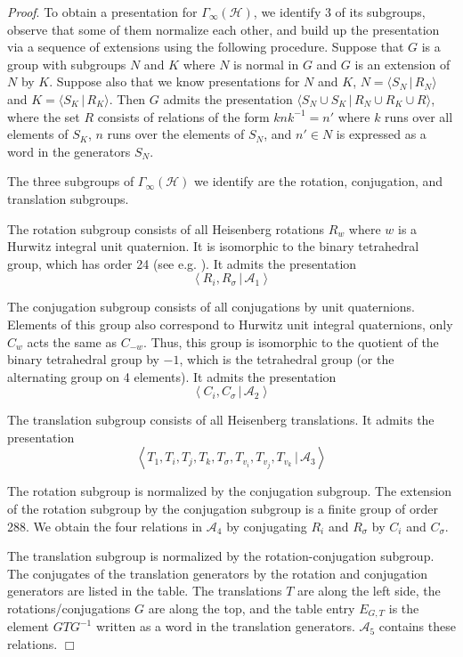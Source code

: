 \documentclass{article}[12pt]
\newcommand{\Pf}{{\em Proof}. }
\newcommand{\EPf}{\hfill$\Box$\vspace{.5cm}}
\begin{document}
\Pf To obtain a presentation for $\Gamma_{\infty}(\mathcal{H})$, we identify 3 of its subgroups, observe that some of them normalize each other, and build up the presentation via a sequence of extensions using the following procedure.  Suppose that $G$ is a group with subgroups $N$ and $K$ where $N$ is normal in $G$ and $G$ is an extension of $N$ by $K$.  Suppose also that we know presentations for $N$ and $K$, $N = \langle S_N\, | \, R_N\rangle$ and $K = \langle S_K\, |\, R_K\rangle$.  Then $G$ admits the presentation
$\langle S_N\cup S_K \, | \, R_N\cup R_K\cup R \rangle$, where the set $R$ consists of relations of the form $knk^{-1} = n'$ where $k$ runs over all elements of $S_K$, $n$ runs over the elements of $S_N$, and $n'\in N$ is expressed as a word in the generators $S_N$.

The three subgroups of $\Gamma_{\infty}(\mathcal{H})$ we identify are the rotation, conjugation, and translation subgroups.  

The rotation subgroup consists of all Heisenberg rotations $R_w$ where $w$ is a Hurwitz integral unit quaternion.  It is isomorphic to the binary tetrahedral group, which has order 24 (see e.g. \cite{CoS}).  It admits the presentation
$$\left\langle R_i, R_\sigma\, |  \, \mathcal{A}_1\right\rangle$$

The conjugation subgroup consists of all conjugations by unit quaternions.  Elements of this group also correspond to Hurwitz unit integral quaternions, only $C_w$ acts the same as $C_{-w}$.  Thus, this group is isomorphic to the quotient of the binary tetrahedral group by $-1$, which is the tetrahedral group (or the alternating group on 4 elements).  It admits the presentation
$$\left\langle C_i, C_\sigma\, | \, \mathcal{A}_2\right\rangle$$

The translation subgroup consists of all Heisenberg translations.  It admits the presentation
$$\left\langle T_1, T_i, T_j, T_k, T_\sigma, T_{v_i},T_{v_j},T_{v_k} \, | \, \mathcal{A}_3\right\rangle$$


The rotation subgroup is normalized by the conjugation subgroup.  The extension of the rotation subgroup by the conjugation subgroup is a finite group of order 288.  We obtain the four relations in $\mathcal{A}_4$ by conjugating $R_i$ and $R_{\sigma}$ by $C_i$ and $C_{\sigma}$.

The translation subgroup is normalized by the rotation-conjugation subgroup.  The conjugates of the translation generators by the rotation and conjugation generators are listed in the table.  The translations $T$ are along the left side, the rotations/conjugations $G$ are along the top, and the table entry $E_{G,T}$ is the element $GTG^{-1}$ written as a word in the translation generators.  $\mathcal{A}_5$ contains these relations. \EPf
\end{document}

